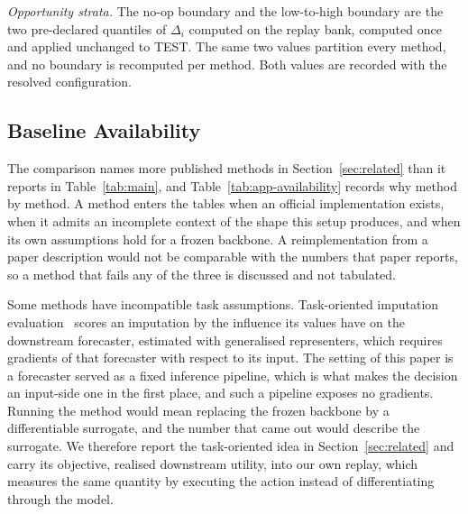 \documentclass{article}
\begin{document}
\emph{Opportunity strata.} The no-op boundary and the low-to-high boundary are the two
pre-declared quantiles of $\Delta_i$ computed on the replay bank, computed once and applied
unchanged to TEST. The same two values partition every method, and no boundary is recomputed
per method. Both values are recorded with the resolved configuration.

\subsection{Baseline Availability}
\label{app:baseline-availability}
The comparison names more published methods in Section~\ref{sec:related} than it reports in
Table~\ref{tab:main}, and Table~\ref{tab:app-availability} records why method by method. A
method enters the tables when an official implementation exists, when it admits an incomplete
context of the shape this setup produces, and when its own assumptions hold for a frozen
backbone. A reimplementation from a paper description would not be comparable with the numbers
that paper reports, so a method that fails any of the three is discussed and not tabulated.

Some methods have incompatible task assumptions. Task-oriented imputation
evaluation~\citep{wang2024taskoriented} scores an imputation by the influence its values have
on the downstream forecaster, estimated with generalised representers, which requires gradients
of that forecaster with respect to its input. The setting of this paper is a forecaster served
as a fixed inference pipeline, which is what makes the decision an input-side one in the first
place, and such a pipeline exposes no gradients. Running the method would mean replacing the
frozen backbone by a differentiable surrogate, and the number that came out would describe the
surrogate. We therefore report the task-oriented idea in Section~\ref{sec:related} and carry
its objective, realised downstream utility, into our own replay, which measures the same
quantity by executing the action instead of differentiating through the model.
\end{document}
